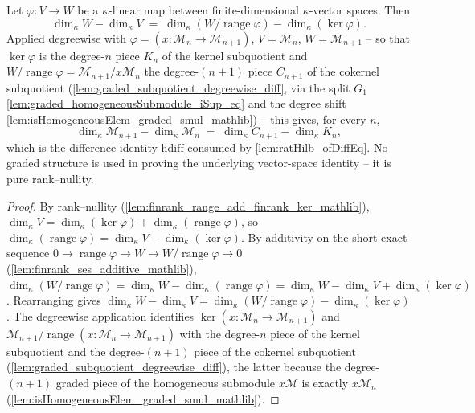 \begin{lemma}\leanok
  \label{lem:graded_degreewise_finrank_diff}
  Let \(\varphi : V \to W\) be a \(\kappa\)-linear map between finite-dimensional
  \(\kappa\)-vector spaces. Then
  \[
    \dim_\kappa W - \dim_\kappa V
      \;=\; \dim_\kappa(W/\operatorname{range}\varphi) - \dim_\kappa(\ker\varphi).
  \]
  Applied degreewise with \(\varphi = (x : \mathcal{M}_n \to \mathcal{M}_{n+1})\),
  \(V = \mathcal{M}_n\), \(W = \mathcal{M}_{n+1}\) -- so that \(\ker\varphi\) is the
  degree-\(n\) piece \(K_n\) of the kernel subquotient and
  \(W/\operatorname{range}\varphi = \mathcal{M}_{n+1}/x \mathcal{M}_n\) the
  degree-\((n+1)\) piece \(C_{n+1}\) of the cokernel subquotient
  (\cref{lem:graded_subquotient_degreewise_diff}, via the split \(G_1\)
  \cref{lem:graded_homogeneousSubmodule_iSup_eq} and the degree shift
  \cref{lem:isHomogeneousElem_graded_smul_mathlib}) -- this gives, for every \(n\),
  \[
    \dim_\kappa \mathcal{M}_{n+1} - \dim_\kappa \mathcal{M}_n
      \;=\; \dim_\kappa C_{n+1} - \dim_\kappa K_n,
  \]
  which is the difference identity \(\mathrm{hdiff}\) consumed by
  \cref{lem:ratHilb_ofDiffEq}. No graded structure is used in proving the
  underlying vector-space identity -- it is pure rank--nullity.
\end{lemma}

\begin{proof}
    \leanok
  By rank--nullity (\cref{lem:finrank_range_add_finrank_ker_mathlib}),
  \(\dim_\kappa V = \dim_\kappa(\ker\varphi) + \dim_\kappa(\operatorname{range}
  \varphi)\), so \(\dim_\kappa(\operatorname{range}\varphi) = \dim_\kappa V -
  \dim_\kappa(\ker\varphi)\). By additivity on the short exact sequence
  \(0 \to \operatorname{range}\varphi \to W \to W/\operatorname{range}\varphi \to 0\)
  (\cref{lem:finrank_ses_additive_mathlib}),
  \(\dim_\kappa(W/\operatorname{range}\varphi) = \dim_\kappa W -
  \dim_\kappa(\operatorname{range}\varphi) = \dim_\kappa W - \dim_\kappa V +
  \dim_\kappa(\ker\varphi)\). Rearranging gives
  \(\dim_\kappa W - \dim_\kappa V = \dim_\kappa(W/\operatorname{range}\varphi) -
  \dim_\kappa(\ker\varphi)\). The degreewise application identifies
  \(\ker(x : \mathcal{M}_n \to \mathcal{M}_{n+1})\) and
  \(\mathcal{M}_{n+1}/\operatorname{range}(x : \mathcal{M}_n \to \mathcal{M}_{n+1})\)
  with the degree-\(n\) piece of the kernel subquotient and the degree-\((n+1)\)
  piece of the cokernel subquotient (\cref{lem:graded_subquotient_degreewise_diff}),
  the latter because the degree-\((n+1)\) graded piece of the homogeneous submodule
  \(x\mathcal{M}\) is exactly \(x \mathcal{M}_n\)
  (\cref{lem:isHomogeneousElem_graded_smul_mathlib}).
\end{proof}

